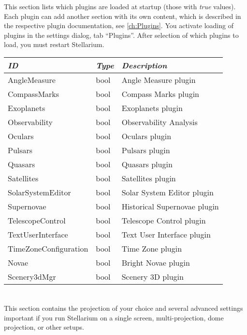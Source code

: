 This section lists which plugins are loaded at startup (those with
\emph{true} values). Each plugin can add another section with its own
content, which is described in the respective plugin documentation,
see \ref{ch:Plugins}. You activate loading of plugins in the 
settings dialog, tab ``Plugins''. After selection of which plugins to
load, you must restart Stellarium.

\begin{longtabu} to \textwidth {l|l|X}
\toprule
\emph{ID} & \emph{Type} & \emph{Description}\\
\midrule
AngleMeasure & bool & Angle Measure plugin\\
\midrule
CompassMarks & bool & Compass Marks plugin\\
\midrule
Exoplanets & bool & Exoplanets plugin \\
\midrule
Observability & bool & Observability Analysis\\
\midrule
Oculars & bool & Oculars plugin \\
\midrule
Pulsars & bool & Pulsars plugin \\
\midrule
Quasars & bool & Quasars plugin \\
\midrule
Satellites & bool & Satellites plugin \\
\midrule
SolarSystemEditor & bool & Solar System Editor plugin\\
\midrule
Supernovae & bool & Historical Supernovae plugin \\
\midrule
TelescopeControl & bool & Telescope Control plugin \\
\midrule
TextUserInterface & bool & Text User Interface plugin \\
\midrule
TimeZoneConfiguration & bool & Time Zone plugin \\
\midrule
Novae & bool & Bright Novae plugin \\
\midrule
Scenery3dMgr & bool & Scenery 3D plugin \\
\bottomrule
\end{longtabu}

\section{}\label{section-projection}

This section contains the projection of your choice and several
advanced settings important if you run Stellarium on a single screen,
multi-projection, dome projection, or other setups.

